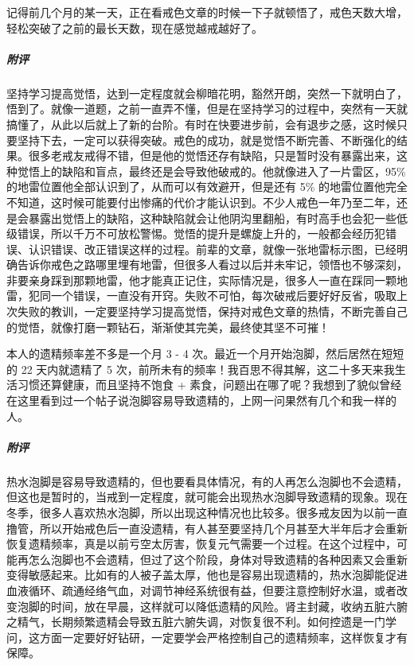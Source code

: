 \begin{case}
    记得前几个月的某一天，正在看戒色文章的时候一下子就顿悟了，戒色天数大增，轻松突破了之前的最长天数，现在感觉越戒越好了。
    \subparagraph{附评} 坚持学习提高觉悟，达到一定程度就会柳暗花明，豁然开朗，突然一下就明白了，悟到了。就像一道题，之前一直弄不懂，但是在坚持学习的过程中，突然有一天就搞懂了，从此以后就上了新的台阶。有时在快要进步前，会有退步之感，这时候只要坚持下去，一定可以获得突破。戒色的成功，就是觉悟不断完善、不断强化的结果。很多老戒友戒得不错，但是他的觉悟还存有缺陷，只是暂时没有暴露出来，这种觉悟上的缺陷和盲点，最终还是会导致他破戒的。他就像进入了一片雷区，95\% 的地雷位置他全部认识到了，从而可以有效避开，但是还有 5\% 的地雷位置他完全不知道，这时候可能要付出惨痛的代价才能认识到。不少人戒色一年乃至二年，还是会暴露出觉悟上的缺陷，这种缺陷就会让他阴沟里翻船，有时高手也会犯一些低级错误，所以千万不可放松警惕。觉悟的提升是螺旋上升的，一般都会经历犯错误、认识错误、改正错误这样的过程。前辈的文章，就像一张地雷标示图，已经明确告诉你戒色之路哪里埋有地雷，但很多人看过以后并未牢记，领悟也不够深刻，非要亲身踩到那颗地雷，他才能真正记住，实际情况是，很多人一直在踩同一颗地雷，犯同一个错误，一直没有开窍。失败不可怕，每次破戒后要好好反省，吸取上次失败的教训，一定要坚持学习提高觉悟，保持对戒色文章的热情，不断完善自己的觉悟，就像打磨一颗钻石，渐渐使其完美，最终使其坚不可摧！
\end{case}

\begin{case}
    本人的遗精频率差不多是一个月 3 - 4 次。最近一个月开始泡脚，然后居然在短短的 22 天内就遗精了 5 次，前所未有的频率！我百思不得其解，这二十多天来我生活习惯还算健康，而且坚持不饱食 + 素食，问题出在哪了呢？我想到了貌似曾经在这里看到过一个帖子说泡脚容易导致遗精的，上网一问果然有几个和我一样的人。
    \subparagraph{附评} 热水泡脚是容易导致遗精的，但也要看具体情况，有的人再怎么泡脚也不会遗精，但这也是暂时的，当戒到一定程度，就可能会出现热水泡脚导致遗精的现象。现在冬季，很多人喜欢热水泡脚，所以出现这种情况也比较多。很多戒友因为以前一直撸管，所以开始戒色后一直没遗精，有人甚至要坚持几个月甚至大半年后才会重新恢复遗精频率，真是以前亏空太厉害，恢复元气需要一个过程。在这个过程中，可能再怎么泡脚也不会遗精，但过了这个阶段，身体对导致遗精的各种因素又会重新变得敏感起来。比如有的人被子盖太厚，他也是容易出现遗精的，热水泡脚能促进血液循环、疏通经络气血，对调节神经系统很有益，但要注意控制好水温，或者改变泡脚的时间，放在早晨，这样就可以降低遗精的风险。肾主封藏，收纳五脏六腑之精气，长期频繁遗精会导致五脏六腑失调，对恢复很不利。如何控遗是一门学问，这方面一定要好好钻研，一定要学会严格控制自己的遗精频率，这样恢复才有保障。
\end{case}

